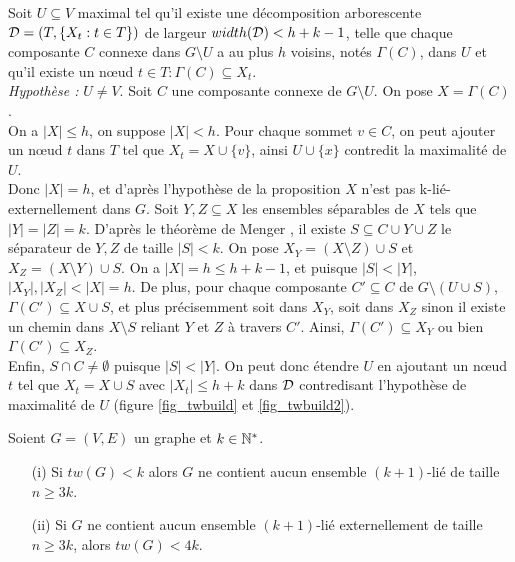 	Soit $U \subseteq V$ maximal tel qu'il existe une décomposition
	arborescente ${\cal D} = (T,\{X_t : t \in T\})$ de largeur 
	$width({\cal D}) < h + k - 1$,
	telle que chaque composante $C$ connexe dans $G \setminus U$ a 
	au plus $h$ voisins, notés $\Gamma(C)$, dans $U$ et qu'il
	existe un n\oe ud $t \in T : \Gamma(C) \subseteq X_t$.
	\\
	{\em Hypothèse :} $U \neq V$.
	Soit $C$ une composante connexe de $G \setminus U$.
	On pose $X = \Gamma(C)$.
	\\
	On a $|X| \leq h$, on suppose $|X| < h$.
	Pour chaque sommet $v \in C$, on peut ajouter un n\oe ud $t$ dans
	$T$ tel que $X_t = X \cup \{v\}$, ainsi $U \cup \{x\}$ 
	contredit la maximalité de $U$.
	\\
	Donc $|X| = h$, et d'après l'hypothèse de la proposition
	$X$ n'est pas k-lié-externellement dans $G$.
	Soit $Y,Z \subseteq X$ les ensembles séparables de $X$ tels que
	$|Y| = |Z| = k$.
	D'après le théorème de Menger \cite{menger}, il existe
	$S \subseteq C \cup Y \cup Z$ le séparateur de $Y,Z$ de taille $|S| < k$.
	On pose $X_Y = (X\setminus Z) \cup S$ et $X_Z = (X \setminus Y) \cup S$.
	On a $|X| = h \leq h + k -1$, et puisque $|S| < |Y|$, $|X_Y|,|X_Z| < |X| = h$.
	De plus, pour chaque composante $C' \subseteq C$ de $G \setminus (U\cup S)$,
	$\Gamma(C') \subseteq X \cup S$, et plus précisemment soit dans $X_Y$, soit dans
	$X_Z$ sinon il existe un chemin dans $X \setminus S$ reliant $Y$ et $Z$ à travers
	$C'$.
	Ainsi, $\Gamma(C') \subseteq X_Y$ ou bien $\Gamma(C') \subseteq X_Z$.
	\\
	Enfin, $S \cap C \neq \emptyset$ puisque $|S| < |Y|$.
	On peut donc étendre $U$ en ajoutant un n\oe ud $t$ tel que
	$X_t = X \cup S$ avec $|X_t| \leq h + k$ dans ${\cal D}$ contredisant l'hypothèse de maximalité
	de $U$ (figure \ref{fig_twbuild} et \ref{fig_twbuild2}).



	
\label{propdiestel}
	Soient $G = (V,E)$ un graphe et $k \in \mathbb{N}^*$.
	\begin{itemize}
		\item[(i)] Si $tw(G) < k$ alors $G$ ne contient aucun ensemble
		$(k+1)$-lié de taille $n \geq 3k$.
		\item[(ii)] Si $G$ ne contient aucun ensemble $(k+1)$-lié externellement
		de taille $n \geq 3k$, alors $tw(G) < 4k$.
	\end{itemize}

